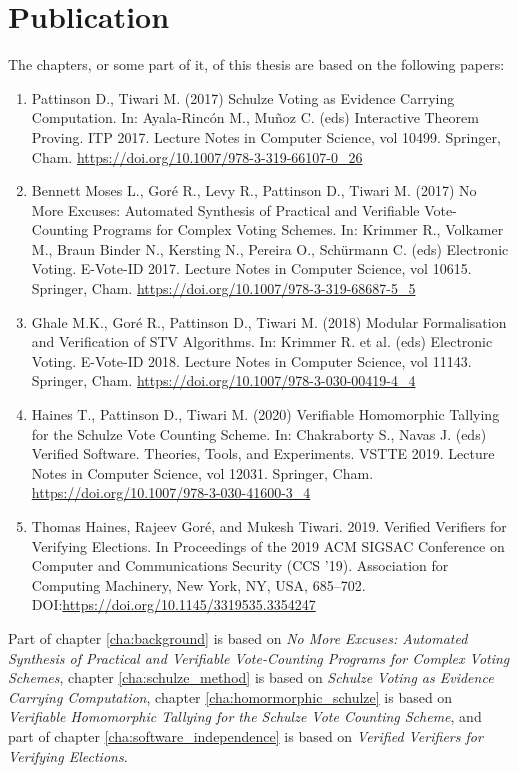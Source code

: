 \section{Publication}
 The chapters, or some part of it,  of this thesis are based on the following papers:
	\begin{enumerate}
	\item Pattinson D., Tiwari M. (2017) Schulze Voting as Evidence Carrying Computation. In: Ayala-Rincón M., Muñoz C. 
	(eds) Interactive Theorem Proving. ITP 2017. Lecture Notes in Computer Science, vol 10499. Springer, Cham.  \url{https://doi.org/10.1007/978-3-319-66107-0_26}
	\item Bennett Moses L., Goré R., Levy R., Pattinson D., Tiwari M. (2017) No More Excuses: Automated Synthesis of Practical and Verifiable Vote-Counting 
	Programs for Complex Voting Schemes. In: Krimmer R., Volkamer M., Braun Binder N., Kersting N., Pereira O., Schürmann C. (eds) Electronic Voting. E-Vote-ID 
	2017. Lecture Notes in Computer Science, vol 10615. Springer, Cham. \url{https://doi.org/10.1007/978-3-319-68687-5_5}
	\item Ghale M.K., Goré R., Pattinson D., Tiwari M. (2018) Modular Formalisation and Verification of STV Algorithms. In: Krimmer R. et al. (eds) Electronic 
	Voting. E-Vote-ID 2018. Lecture Notes in Computer Science, vol 11143. Springer, Cham.  \url{https://doi.org/10.1007/978-3-030-00419-4_4}
	\item Haines T., Pattinson D., Tiwari M. (2020) Verifiable Homomorphic Tallying for the Schulze Vote Counting Scheme. In: Chakraborty S., Navas J. (eds) 
	Verified Software. Theories, Tools, and Experiments. VSTTE 2019. Lecture Notes in Computer Science, vol 12031. Springer, Cham. \url{https://doi.org/10.1007/978-3-030-41600-3_4}
	\item Thomas Haines, Rajeev Goré, and Mukesh Tiwari. 2019. Verified Verifiers for Verifying Elections. In Proceedings of the 2019 ACM SIGSAC Conference on 
	Computer and Communications Security (CCS '19). Association for Computing Machinery, New York, NY, USA, 685–702. DOI:\url{https://doi.org/10.1145/3319535.3354247}
	\end{enumerate}
 \noindent
 Part of chapter \ref{cha:background} is based on \textit{No More Excuses: Automated Synthesis of Practical 
 and Verifiable Vote-Counting Programs for Complex Voting  Schemes},
 chapter \ref{cha:schulze_method} is based on \textit{Schulze Voting as Evidence Carrying Computation},
 chapter \ref{cha:homormorphic_schulze} is based on \textit{Verifiable Homomorphic Tallying for the 
 Schulze Vote Counting Scheme}, and part of chapter
 \ref{cha:software_independence} is based on \textit{Verified Verifiers for Verifying Elections}.




